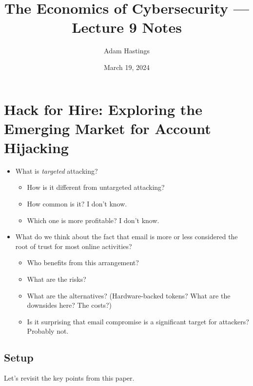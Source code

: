\documentclass[11pt]{article}
\title{The Economics of Cybersecurity --- Lecture 9 Notes}
\date{March 19, 2024}
\author{Adam Hastings}
\begin{document}
\maketitle



\section{Hack for Hire: Exploring the Emerging Market for Account Hijacking}


\begin{itemize}
    \item What is {\it targeted } attacking? 
    \begin{itemize}
        \item How is it different from untargeted attacking?
        \item How common is it? I don't know.
        \item Which one is more profitable? I don't know.
    \end{itemize}
    \item What do we think about the fact that email is more or less considered the root of trust for most online activities?
    \begin{itemize}
        \item Who benefits from this arrangement?
        \item What are the risks?
        \item What are the alternatives? (Hardware-backed tokens? What are the downsides here? The costs?)
        \item Is it surprising that email compromise is a significant target for attackers? Probably not. 
    \end{itemize}
\end{itemize}

\subsection{Setup}

Let's revisit the key points from this paper. 
\end{document}
